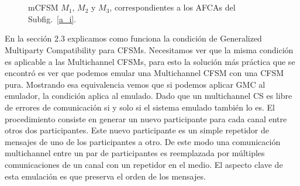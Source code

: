 \begin{ejemplo}
\begin{figure}[H]
\begin{center}
\
\ 
\end{center}
\caption{mCFSM $M_1$, $M_2$ y $M_3$, correspondientes a los AFCAs del Subfig.~\ref{a_i}.}
\label{m_i}
\end{figure}

\end{ejemplo}


En la sección 2.3 explicamos como funciona la condición de Generalized Multiparty Compatibility para CFSMs. Necesitamos ver que la misma condición es aplicable a las Multichannel CFSMs, para esto la solución más práctica que se encontró es ver que podemos emular una Multichannel CFSM con una CFSM pura. Mostrando esa equivalencia vemos que si podemos aplicar GMC al emulador, la condición aplica al emulado. Dado que un multichannel CS es libre de errores de comunicación si y solo si el sistema emulado también lo es. El procedimiento consiste en generar un nuevo participante para cada canal entre otros dos participantes. Este nuevo participante es un simple repetidor de mensajes de uno de los participantes a otro. De este modo una comunicación multichannel entre un par de participantes es reemplazada por múltiples comunicaciones de un canal con un repetidor en el medio. El aspecto clave de esta emulación es que preserva el orden de los mensajes.

